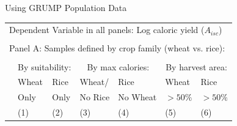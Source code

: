 \documentclass[10pt, xcolor=dvipsnames]{beamer}
\begin{document}
\begin{frame}{Using GRUMP Population Data}

{\footnotesize
\begin{tabularx}{\textwidth}{lXXXXXX}
\midrule
\multicolumn{7}{l}{Dependent Variable in all panels: Log caloric yield ($A_{isc}$)} \\ \\
\multicolumn{7}{l}{Panel A: Samples defined by crop family (wheat vs. rice):} \\ \\
 & \multicolumn{2}{c}{By suitability:} & \multicolumn{2}{c}{By max calories:} & \multicolumn{2}{c}{By harvest area:}\\ \cmidrule(lr){2-3} \cmidrule(lr){4-5} \cmidrule(lr){6-7} 
 & Wheat & Rice & Wheat/  & Rice  & Wheat  & Rice \\
 & Only & Only &  No Rice & No Wheat & $>50\%$ & $>50\%$   \\
 & (1) & (2) & (3) & (4) & (5) & (6) \\
\midrule

\midrule
\end{tabularx}
}

\hfill \hyperlink{robustness}{}
\end{frame}
\end{document}
